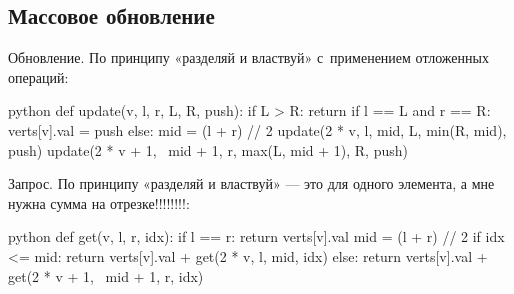 \subsection{Массовое обновление}

{\bold Обновление.} По принципу {\ital «разделяй и властвуй»} с~применением {\ital отложенных операций}:
\begin{code}{python}
def update(v, l, r, L, R, push):
  if L > R:
    return
  if l == L and r == R:
    verts[v].val = push
  else:
    mid = (l + r) // 2
    update(2 * v, l, mid, L, min(R, mid), push)
    update(2 * v + 1, \
           mid + 1, r, max(L, mid + 1), R, push)
\end{code}

{\bold Запрос.} По принципу {\ital «разделяй и властвуй»} --- это для одного элемента, а мне нужна сумма на отрезке!!!!!!!!:
\begin{code}{python}
def get(v, l, r, idx):
  if l == r:
    return verts[v].val
  mid = (l + r) // 2
  if idx <= mid:
    return verts[v].val + get(2 * v, l, mid, idx)
  else:
    return verts[v].val + get(2 * v + 1, \
                              mid + 1, r, idx)
\end{code}
